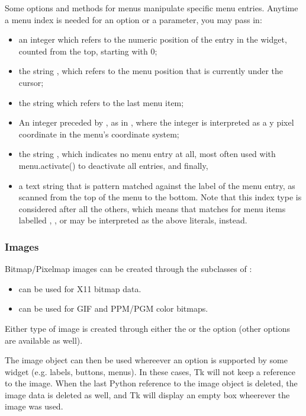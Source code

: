 \begin{description}
Some options and methods for menus manipulate specific menu entries.
Anytime a menu index is needed for an option or a parameter, you may
pass in: 
\begin{itemize}
\item   an integer which refers to the numeric position of the entry in
the widget, counted from the top, starting with 0; 
\item   the string , which refers to the menu position that is
currently under the cursor;
\item   the string  which refers to the last menu
item;  
\item   An integer preceded by , as in , where the integer is
interpreted as a y pixel coordinate in the menu's coordinate system;
\item   the string , which indicates no menu entry at all, most
often used with menu.activate() to deactivate all entries, and
finally,
\item   a text string that is pattern matched against the label of the
menu entry, as scanned from the top of the menu to the bottom.  Note
that this index type is considered after all the others, which means
that matches for menu items labelled , , or
 may be interpreted as the above literals, instead.
\end{itemize}
\end{description}

\subsubsection{Images}

Bitmap/Pixelmap images can be created through the subclasses of
:

\begin{itemize}
\item  {} can be used for X11 bitmap data.
\item  {} can be used for GIF and PPM/PGM color bitmaps.
\end{itemize}

Either type of image is created through either the  or the
 option (other options are available as well).

The image object can then be used whereever an  option is
supported by some widget (e.g. labels, buttons, menus). In these
cases, Tk will not keep a reference to the image. When the last Python
reference to the image object is deleted, the image data is deleted as
well, and Tk will display an empty box wheerever the image was used.

